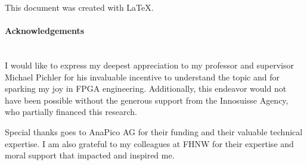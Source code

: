\documentclass[twoside,final]{fhnwreport}       %
\begin{document}
\begin{center}
		
		\vfill
		
		\begin{normalsize}
			{\begin{tabbing}
			\end{tabbing}}
		\end{normalsize}
	\end{center}
\clearpage
\thispagestyle{empty}
\begin{center}
This document was created with \LaTeX.\\
\end{center}
\clearpage
\thispagestyle{empty}


\clearpage
\thispagestyle{empty}
\paragraph{Acknowledgements}\,\\

I would like to express my deepest appreciation to my professor and supervisor Michael Pichler for his invaluable incentive to understand the topic and for sparking my joy in FPGA engineering.
Additionally, this endeavor would not have been possible without the generous support from the Innosuisse Agency, who partially financed this research.

Special thanks goes to AnaPico AG for their funding and their valuable technical expertise. I am also grateful to my colleagues at FHNW for their expertise and moral support that impacted and inspired me.

\clearpage

\tableofcontents
\clearpage
\end{document}
